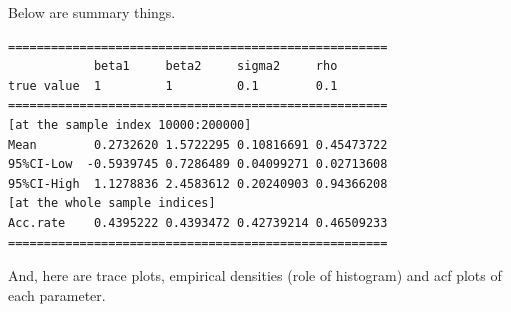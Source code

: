 \documentclass{article}
\begin{document}
Below are summary things.
\begin{verbatim}
=====================================================
            beta1     beta2     sigma2     rho
true value  1         1         0.1        0.1
=====================================================
[at the sample index 10000:200000]
Mean        0.2732620 1.5722295 0.10816691 0.45473722
95%CI-Low  -0.5939745 0.7286489 0.04099271 0.02713608
95%CI-High  1.1278836 2.4583612 0.20240903 0.94366208
[at the whole sample indices]
Acc.rate    0.4395222 0.4393472 0.42739214 0.46509233
=====================================================        
\end{verbatim}

And, here are trace plots, empirical densities (role of histogram) and acf plots of
each parameter.

\clearpage
\end{document}
